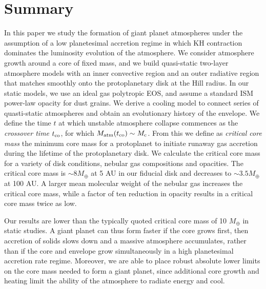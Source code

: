 \documentclass[apj, numberedappendix]{emulateapj}
\begin{document}
\section{Summary} \label{sec:conclusions}

 In this paper we study the formation of giant planet atmospheres under the assumption of a low planetesimal accretion regime in which KH contraction dominates the luminosity evolution of the atmosphere. We consider atmosphere growth around a core of fixed mass, and we build quasi-static two-layer atmosphere models with an inner convective region and an outer radiative region that matches smoothly onto the protoplanetary disk at the Hill radius. In our static models, we use an ideal gas polytropic EOS, and assume a standard ISM power-law opacity for dust grains. We derive a cooling model to connect series of quasti-static atmospheres and obtain an evolutionary history of the envelope. We define the time $t$ at which unstable atmosphere collapse commences as the \textit{crossover time} $t_{\rm{co}}$, for which $M_{\rm atm}(t_{\rm{co}})\sim M_{\rm c}$. From this we define as \textit{critical core mass} the minimum core mass for a protoplanet to initiate runaway gas accretion during the lifetime of the protoplanetary disk. We calculate the critical core mass for a variety of disk conditions, nebular gas compositions and opacities. The critical core mass is $\sim 8 M_{\oplus}$ at 5 AU in our fiducial disk and decreases to $\sim 3.5 M_{\oplus}$ at 100 AU. A larger mean molecular weight of the nebular gas increases the critical core mass, while a factor of ten reduction in opacity results in a critical core mass twice as low. 
 
Our results are lower than the typically quoted critical core mass of 10 $M_{\oplus}$ in static studies. A giant planet can thus form faster if the core grows first, then accretion of solids slows down and a massive atmosphere accumulates, rather than if the core and envelope grow simultaneously in a high planetesimal accretion rate regime. Moreover, we are able to place robust absolute lower limits on the core mass needed to form a giant planet, since additional core growth and heating limit the ability of the atmosphere to radiate energy and cool.

  
\end{document}
